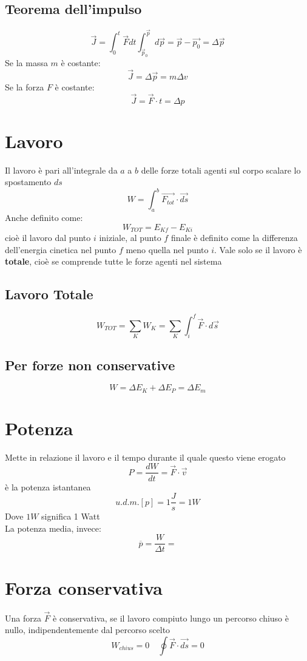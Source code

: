 \documentclass[a4paper]{report}
\begin{document}
  \subsection{Teorema dell'impulso}
  $$ \vec{J} = \int_0^t \vec{F} dt \int_{\vec{p}_0}^{\vec{p}} d\vec{p} = \vec{p} - \vec{p_0} = \Delta \vec{p} $$
  Se la massa $m$ è costante:
  $$ \vec{J} = \Delta \vec{p} = m \Delta v $$
  Se la forza $F$ è costante:
  $$ \vec{J} = \vec{F} \cdot t = \Delta p  $$

  \section{Lavoro}
  Il lavoro è pari all'integrale da $a$ a $b$ delle forze totali agenti sul corpo scalare lo spostamento $ds$
  $$ W = \int_{a}^{b} \vec{F_{tot}} \cdot \vec{ds} $$
  Anche definito come:
  $$ W_{TOT} = E_{Kf} - E_{Ki} $$
  cioè il lavoro dal punto $i$ iniziale, al punto $f$ finale è definito come la differenza dell'energia cinetica nel punto $f$ meno quella nel punto $i$. Vale solo se il lavoro è \textbf{totale}, cioè se comprende tutte le forze agenti nel sistema
  \subsection{Lavoro Totale}
  $$ W_{TOT} = \sum_K W_K = \sum_K \int_i^f \vec{F}\cdot d\vec{s} $$
  \subsection{Per forze non conservative}
  $$ W = \Delta E_K + \Delta E_P = \Delta E_m $$


  \section{Potenza}
  Mette in relazione il lavoro e il tempo durante il quale questo viene erogato
  $$ P = \frac{dW}{dt} = \vec{F} \cdot \vec{v} $$
  è la potenza istantanea
  $$ u.d.m.[p] = 1 \frac{J}{s} = 1W $$
  Dove $1W$ significa 1 Watt\\
  La potenza media, invece:
  $$ \overline{p} = \frac{W}{\Delta t} =  $$


  \section{Forza conservativa}
  Una forza $\vec{F}$ è conservativa, se il lavoro compiuto lungo un percorso chiuso è nullo, indipendentemente dal percorso scelto
  $$ W_{chius} = 0 \quad \oint \vec{F} \cdot \vec{ds} = 0 $$
\end{document}
